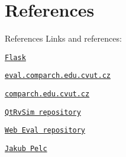 \documentclass{beamer}
\begin{document}
	\section{References}

	\begin{frame}{References}
		Links and references: \par
		{\centering \texttt{\href{https://flask.palletsprojects.com/en/3.0.x/}{Flask}} \par}
		{\centering \texttt{\href{http://eval.comparch.edu.cvut.cz}{eval.comparch.edu.cvut.cz}} \par}
		{\centering \texttt{\href{http://comparch.edu.cvut.cz}{comparch.edu.cvut.cz}} \par}
		{\centering \texttt{\href{https://github.com/cvut/qtrvsim}{QtRvSim repository}} \par}
		{\centering \texttt{\href{https://gitlab.fel.cvut.cz/b35apo/qtrvsim-eval-web}{Web Eval repository}} \par}
		{\centering \texttt{\href{https://swpelc.eu}{Jakub Pelc}} \par}
	\end{frame}
\end{document}
